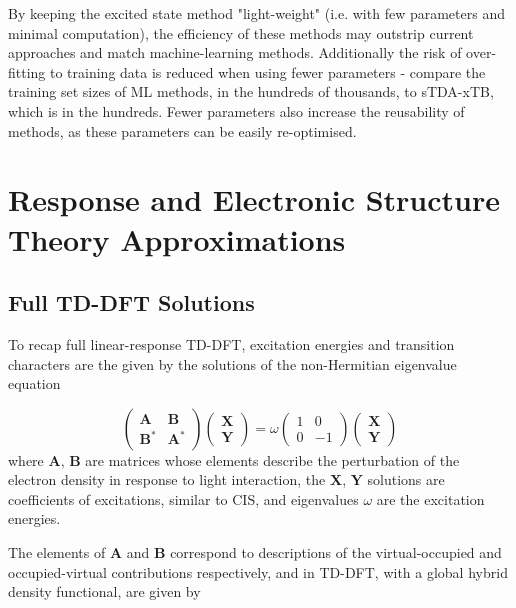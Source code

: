 By keeping the excited state method "light-weight" (i.e. with few parameters and 
minimal computation), the efficiency of these methods may outstrip current approaches 
and match machine-learning methods. Additionally the risk of over-fitting to training 
data is reduced when using fewer parameters - compare the training set sizes of ML
methods, in the hundreds of thousands, to sTDA-xTB, which is in the hundreds. Fewer
parameters also increase the reusability of methods, as these parameters can be easily
re-optimised.

\section{Response and Electronic Structure Theory Approximations}
\label{sec:theory}

\subsection{Full TD-DFT Solutions}
\label{subsec:tddft_equation}
To recap full linear-response TD-DFT, excitation energies and transition characters 
are the given by the solutions of the non-Hermitian eigenvalue equation

\begin{equation}
    \begin{pmatrix}
        \mathbf{A}   & \mathbf{B} \\
        \mathbf{B}^\ast  & \mathbf{A}^\ast
    \end{pmatrix}
    \begin{pmatrix}
        \mathbf{X} \\
        \mathbf{Y}
    \end{pmatrix}
    = 
    \omega
    \begin{pmatrix}
        1 & 0 \\
        0 & -1
    \end{pmatrix}
    \begin{pmatrix}
        \mathbf{X} \\
        \mathbf{Y}
    \end{pmatrix}
\end{equation}
%
where $\mathbf{A}$, $\mathbf{B}$ are matrices whose elements describe the perturbation
of the electron density in response to light interaction, the $\mathbf{X}$, $\mathbf{Y}$
solutions are coefficients of excitations, similar to CIS, and eigenvalues $\omega$
are the excitation energies.

The elements of $\mathbf{A}$ and $\mathbf{B}$ correspond to descriptions of the
virtual-occupied and occupied-virtual contributions respectively, and in TD-DFT, 
with a global hybrid density functional, are given by


